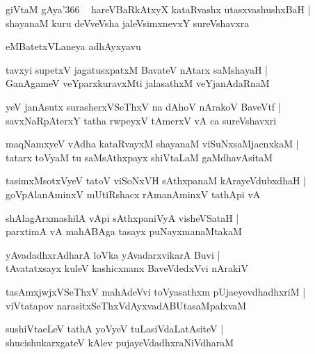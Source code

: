\documentclass[twoside,12pt,openright]{book}
\newcounter{shloka}[chapter]
\begin{document}
\begin{shloka}%
giVtaM gAya\char'366 ~ hareVBaRkAtxyX kataRvashx utasxvashushxBaH |\\
shayanaM kuru deVveVsha jaleVsimxnevxY sureVshavxra
\end{shloka}

\begin{center}
eMBatetxVLaneya adhAyxyavu
\end{center}

\begin{shloka}%
tavxyi supetxV jagatusxpatxM BavateV nAtarx saMshayaH |\\
GanAgameV veYparxkuravxMti jalasathxM veYjanAdaRnaM 
\end{shloka}

\begin{shloka}%
yeV janAsutx surasherxVSeThxV na dAhoV nArakoV BaveVtf |\\
savxNaRpAterxY tatha rwpeyxV tAmerxV vA ca sureVshavxri
\end{shloka}

\begin{shloka}%
maqNamxyeV vAdha kataRvayxM shayanaM viSuNxsaMjacnxkaM |\\
tatarx toVyaM tu saMsAthxpayx shiVtaLaM gaMdhavAsitaM 
\end{shloka}

\begin{shloka}%
tasimxMsotxVyeV tatoV viSoNxVH sAthxpanaM kArayeVdubxdhaH |\\
goVpAlanAminxV mUtiRshacx rAmanAminxV tathApi vA 
\end{shloka}

\begin{shloka}%
shAlagArxmashilA vApi sAthxpaniVyA visheVSataH |\\
parxtimA vA mahABAga tasayx puNayxmanaMtakaM 
\end{shloka}

\begin{shloka}%
yAvadadhxrAdharA loVka yAvadarxvikarA Buvi |\\
tAvatatxsayx kuleV kashicxnanx BaveVdedxVvi nArakiV 
\end{shloka}

\begin{shloka}%
tasAmxjwjxVSeThxV mahAdeVvi toVyasathxm pUjaeyevdhadhxriM |\\
viVtatapov narasitxSeThxVdAyxvadABUtasaMpalxvaM 
\end{shloka}

\begin{shloka}%
sushiVtaeLeV tathA yoVyeV tuLasiVdaLatAsiteV |\\
shucishukarxgateV kAlev pujayeVdadhxraNiVdharaM 
\end{shloka}
\end{document}
